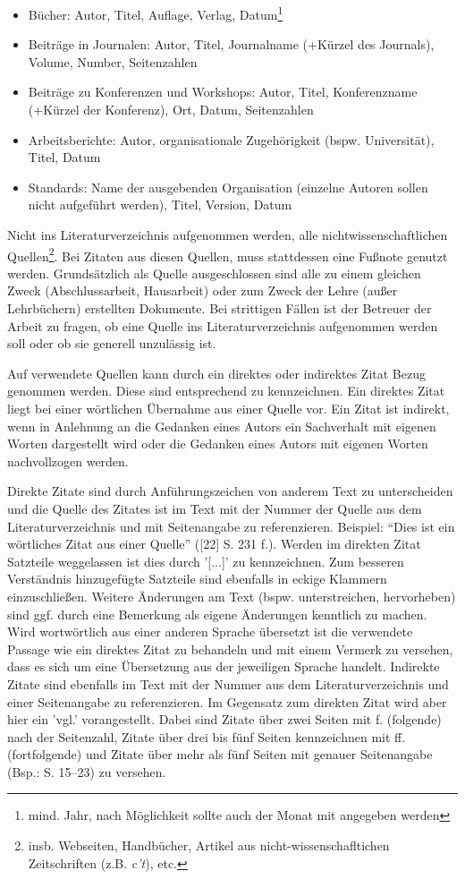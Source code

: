 \begin{itemize}
	\item Bücher: Autor, Titel, Auflage, Verlag, Datum\footnote{mind. Jahr, nach Möglichkeit sollte auch der Monat mit angegeben werden}
	\item Beiträge in Journalen: Autor, Titel, Journalname (+Kürzel des Journals), Volume, Number, Seitenzahlen
	\item Beiträge zu Konferenzen und Workshops: Autor, Titel, Konferenzname (+Kürzel der Konferenz), Ort, Datum, Seitenzahlen
	\item Arbeitsberichte: Autor, organisationale Zugehörigkeit (bspw. Universität), Titel, Datum
	\item Standards: Name der ausgebenden Organisation (einzelne Autoren sollen nicht aufgeführt werden), Titel, Version, Datum
\end{itemize}

Nicht ins Literaturverzeichnis aufgenommen werden, alle nichtwissenschaftlichen Quellen\footnote{insb. Webseiten, Handbücher, Artikel aus nicht-wissenschafltichen Zeitschriften (z.B. \textit{c't}), etc.}. Bei Zitaten aus diesen Quellen, muss stattdessen eine Fußnote genutzt werden. 
Grundsätzlich als Quelle ausgeschlossen sind alle zu einem gleichen
Zweck (Abschlussarbeit, Hausarbeit) oder zum Zweck der Lehre (außer Lehrbüchern)
erstellten Dokumente. 
Bei strittigen Fällen ist der Betreuer der Arbeit zu fragen, ob eine Quelle ins Literaturverzeichnis aufgenommen werden soll oder ob sie generell unzulässig ist.

Auf verwendete Quellen kann durch ein direktes oder indirektes Zitat Bezug genommen
werden. Diese sind entsprechend zu kennzeichnen. Ein direktes Zitat liegt bei einer wörtlichen
Übernahme aus einer Quelle vor. Ein Zitat ist indirekt, wenn in Anlehnung an
die Gedanken eines Autors ein Sachverhalt mit eigenen Worten dargestellt wird oder die
Gedanken eines Autors mit eigenen Worten nachvollzogen werden.

Direkte Zitate sind durch Anführungszeichen von anderem Text zu unterscheiden und die
Quelle des Zitates ist im Text mit der Nummer der Quelle aus dem Literaturverzeichnis
und mit Seitenangabe zu referenzieren. Beispiel: "`Dies ist ein wörtliches Zitat aus einer
Quelle"' ([22] S. 231 f.). Werden im direkten Zitat Satzteile weggelassen ist dies durch
'[...]' zu kennzeichnen. Zum besseren Verständnis hinzugefügte Satzteile sind ebenfalls
in eckige Klammern einzuschließen. Weitere Änderungen am Text (bspw. unterstreichen,
hervorheben) sind ggf. durch eine Bemerkung als eigene Änderungen kenntlich zu machen.
Wird wortwörtlich aus einer anderen Sprache übersetzt ist die verwendete Passage wie
ein direktes Zitat zu behandeln und mit einem Vermerk zu versehen, dass es sich um eine
Übersetzung aus der jeweiligen Sprache handelt. Indirekte Zitate sind ebenfalls im Text
mit der Nummer aus dem Literaturverzeichnis und einer Seitenangabe zu referenzieren.
Im Gegensatz zum direkten Zitat wird aber hier ein 'vgl.' vorangestellt. Dabei sind Zitate
über zwei Seiten mit f. (folgende) nach der Seitenzahl, Zitate über drei bis fünf Seiten
kennzeichnen mit ff. (fortfolgende) und Zitate über mehr als fünf Seiten mit genauer
Seitenangabe (Bsp.: S. 15--23) zu versehen.

